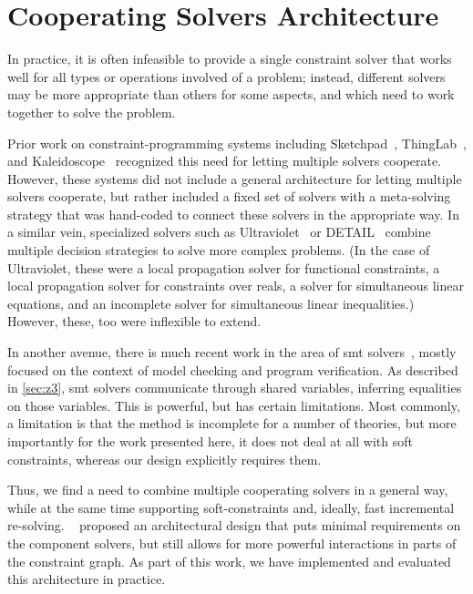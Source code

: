 \section{Cooperating Solvers Architecture}
\label{sec:coop-solv-arch}

In practice, it is often infeasible to provide a single constraint
solver that works well for all types or operations involved of a
problem; instead, different solvers may be more appropriate than
others for some aspects, and which need to work together to solve the
problem.

Prior work on constraint-programming systems including Sketchpad~\cite{sutherland-ifips-1963}, ThingLab~\cite{borning-toplas-1981}, and
Kaleidoscope~\cite{freeman-benson-iccl-1992} recognized this need for
letting multiple solvers cooperate. However, these systems did not
include a general architecture for letting multiple solvers cooperate,
but rather included a fixed set of solvers with a meta-solving
strategy that was hand-coded to connect these solvers in the
appropriate way. In a similar vein, specialized solvers such as
Ultraviolet~\cite{borning1998ultraviolet} or DETAIL~\cite{hosobe2001modular} combine multiple decision strategies to solve
more complex problems. (In the case of Ultraviolet, these were a local
propagation solver for functional constraints, a local propagation
solver for constraints over reals, a solver for simultaneous linear
equations, and an incomplete solver for simultaneous linear
inequalities.) However, these, too were inflexible to extend.

In another avenue, there is much recent work in the area of \gls{smt}
solvers~\cite{nelson-oppen-1979}, mostly focused on the context of
model checking and program verification. As described in
\autoref{sec:z3}, \gls{smt} solvers communicate through shared
variables, inferring equalities on those variables. This is powerful,
but has certain limitations. Most commonly, a limitation is that the
method is incomplete for a number of theories, but more importantly
for the work presented here, it does not deal at all with soft
constraints, whereas our design explicitly requires them.

Thus, we find a need to combine multiple cooperating solvers in a
general way, while at the same time supporting soft-constraints and,
ideally, fast incremental
re-solving. \citeauthor{borning2012architectures}~\cite{borning2012architectures} proposed an architectural design that
puts minimal requirements on the component solvers, but still allows
for more powerful interactions in parts of the constraint graph. As
part of this work, we have implemented and evaluated this architecture
in practice.

